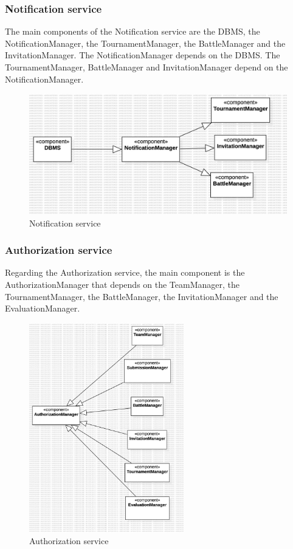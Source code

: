 \subsubsection*{Notification service}
The main components of the Notification service are the DBMS, the NotificationManager, the TournamentManager, the BattleManager and the InvitationManager. The NotificationManager depends on the DBMS. The TournamentManager, BattleManager and InvitationManager depend on the NotificationManager.
\begin{figure}[H]
    \centering
    \includegraphics[width=\textwidth]{Diagrams/NotificationIntegrationPlan.jpg}
    \caption{Notification service}
    \label{fig:notification}
\end{figure}
\clearpage
\subsubsection*{Authorization service}
Regarding the Authorization service, the main component is the AuthorizationManager that depends on the TeamManager, the TournamentManager, the BattleManager, the InvitationManager and the EvaluationManager.
\begin{figure}[H]
    \centering
    \includegraphics[width=0.6\textwidth]{Diagrams/AuthorizationIntegrationPlan.jpg}
    \caption{Authorization service}
    \label{fig:authorization}
\end{figure}

